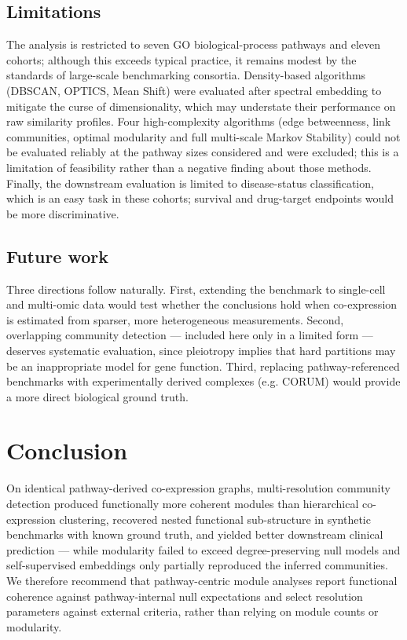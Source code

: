 \documentclass[twocolumn,11pt]{article}
\begin{document}
\subsection{Limitations}

The analysis is restricted to seven GO biological-process pathways and eleven cohorts;
although this exceeds typical practice, it remains modest by the standards of large-scale
benchmarking consortia. Density-based algorithms (DBSCAN, OPTICS, Mean Shift) were evaluated
after spectral embedding to mitigate the curse of dimensionality, which may understate their
performance on raw similarity profiles. Four high-complexity algorithms (edge betweenness,
link communities, optimal modularity and full multi-scale Markov Stability) could not be
evaluated reliably at the pathway sizes considered and were excluded; this is a limitation of
feasibility rather than a negative finding about those methods. Finally, the downstream
evaluation is limited to disease-status classification, which is an easy task in these
cohorts; survival and drug-target endpoints would be more discriminative.

\subsection{Future work}

Three directions follow naturally. First, extending the benchmark to single-cell and
multi-omic data would test whether the conclusions hold when co-expression is estimated from
sparser, more heterogeneous measurements. Second, overlapping community detection ---
included here only in a limited form --- deserves systematic evaluation, since pleiotropy
implies that hard partitions may be an inappropriate model for gene function. Third,
replacing pathway-referenced benchmarks with experimentally derived complexes (e.g. CORUM)
would provide a more direct biological ground truth.

\section{Conclusion}

On identical pathway-derived co-expression graphs, multi-resolution community detection
produced functionally more coherent modules than hierarchical co-expression clustering,
recovered nested functional sub-structure in synthetic benchmarks with known ground truth,
and yielded better downstream clinical prediction --- while modularity failed to exceed
degree-preserving null models and self-supervised embeddings only partially reproduced the
inferred communities. We therefore recommend that pathway-centric module analyses report
functional coherence against pathway-internal null expectations and select resolution
parameters against external criteria, rather than relying on module counts or modularity.
\end{document}
